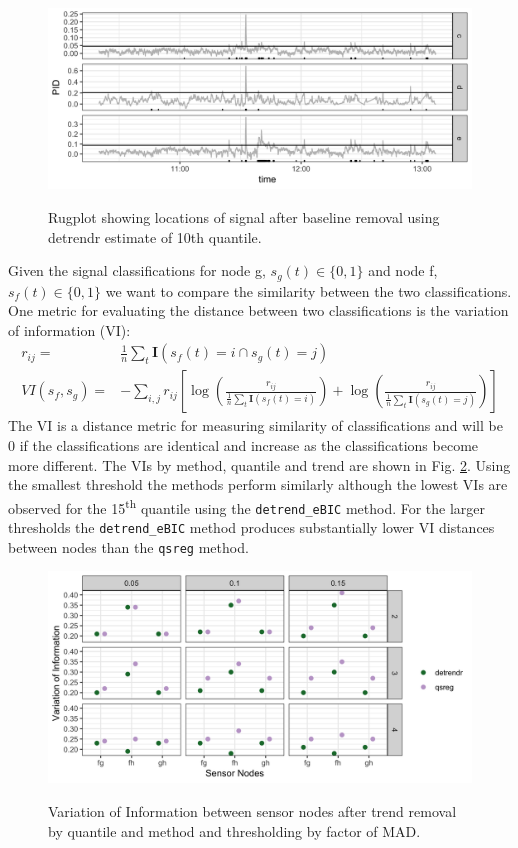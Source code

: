 \documentclass[12pt]{article}
\begin{document}
 	\begin{figure}
	 	\caption{Rugplot showing locations of signal after baseline removal using detrendr estimate of 10th quantile.}
	 	\includegraphics[width = \linewidth]{Figures/corrected_rugplot.png}
	 	\label{fig:rugplot}
	 \end{figure}
	 
	Given the signal classifications for node g, $s_g(t) \in \{0,1\}$ and node f, $s_f(t)\in\{0,1\}$ we want to compare the similarity between the two classifications. One metric for evaluating the distance between two classifications is the variation of information (VI): 
	\begin{align}
		r_{ij} =& \frac{1}{n}\sum_t \mathbf{I}(s_f(t) = i  \cap s_g(t) = j)\\
		VI(s_f, s_g) =& -\sum_{i,j} r_{ij} \left[ \log \left(\frac{r_{ij}}{\frac{1}{n}\sum_t \mathbf{I}(s_f(t) = i)}\right) + 
		\log \left(\frac{r_{ij}}{\frac{1}{n}\sum_t \mathbf{I}(s_g(t) = j)}\right) \right]
	\end{align}	
	The VI is a distance metric for measuring similarity of classifications and will be 0 if the classifications are identical and increase as the classifications become more different. The VIs by method, quantile and trend are shown in Fig. \ref{fig:vi}. Using the smallest threshold the methods perform similarly although the lowest VIs are observed for the 15\textsuperscript{th} quantile using the \texttt{detrend\_eBIC} method. For the larger thresholds the \texttt{detrend\_eBIC} method produces substantially lower VI distances between nodes than the \texttt{qsreg} method.  
	
	\begin{figure}
		\centering
		\caption{Variation of Information between sensor nodes after trend removal by quantile and method and thresholding by factor of MAD.}
		\includegraphics[width = .9\linewidth]{Figures/VI_app_short.png}
		\label{fig:vi}
	\end{figure}
	
\end{document}

